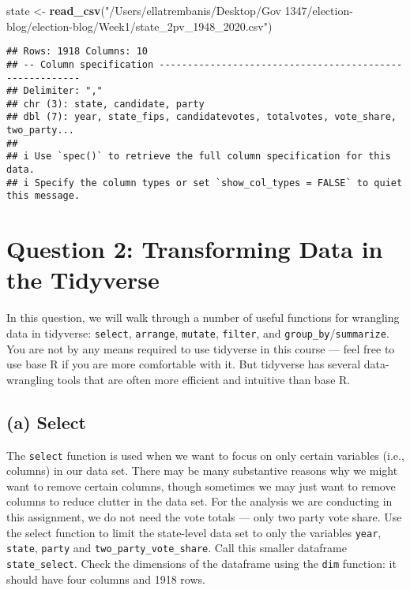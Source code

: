 \documentclass[
]{article}
\newenvironment{Shaded}{\begin{snugshade}}{\end{snugshade}}
\newcommand{\FunctionTok}[1]{\textcolor[rgb]{0.13,0.29,0.53}{\textbf{#1}}}
\newcommand{\NormalTok}[1]{#1}
\newcommand{\OtherTok}[1]{\textcolor[rgb]{0.56,0.35,0.01}{#1}}
\newcommand{\StringTok}[1]{\textcolor[rgb]{0.31,0.60,0.02}{#1}}
\begin{document}
\begin{Shaded}
\begin{Highlighting}[]
\NormalTok{state }\OtherTok{\textless{}{-}} \FunctionTok{read\_csv}\NormalTok{(}\StringTok{"/Users/ellatrembanis/Desktop/Gov 1347/election{-}blog/election{-}blog/Week1/state\_2pv\_1948\_2020.csv"}\NormalTok{)}
\end{Highlighting}
\end{Shaded}

\begin{verbatim}
## Rows: 1918 Columns: 10
## -- Column specification --------------------------------------------------------
## Delimiter: ","
## chr (3): state, candidate, party
## dbl (7): year, state_fips, candidatevotes, totalvotes, vote_share, two_party...
## 
## i Use `spec()` to retrieve the full column specification for this data.
## i Specify the column types or set `show_col_types = FALSE` to quiet this message.
\end{verbatim}

\section{Question 2: Transforming Data in the
Tidyverse}\label{question-2-transforming-data-in-the-tidyverse}

In this question, we will walk through a number of useful functions for
wrangling data in tidyverse: \texttt{select}, \texttt{arrange},
\texttt{mutate}, \texttt{filter}, and
\texttt{group\_by}/\texttt{summarize}. You are not by any means required
to use tidyverse in this course --- feel free to use base R if you are
more comfortable with it. But tidyverse has several data-wrangling tools
that are often more efficient and intuitive than base R.

\subsection{(a) Select}\label{a-select}

The \texttt{select} function is used when we want to focus on only
certain variables (i.e., columns) in our data set. There may be many
substantive reasons why we might want to remove certain columns, though
sometimes we may just want to remove columns to reduce clutter in the
data set. For the analysis we are conducting in this assignment, we do
not need the vote totals --- only two party vote share. Use the select
function to limit the state-level data set to only the variables
\texttt{year}, \texttt{state}, \texttt{party} and
\texttt{two\_party\_vote\_share}. Call this smaller dataframe
\texttt{state\_select}. Check the dimensions of the dataframe using the
\texttt{dim} function: it should have four columns and 1918 rows.
\end{document}

